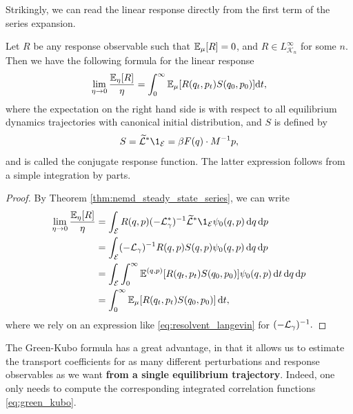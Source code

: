 Strikingly, we can read the linear response directly from the first term of the series expansion.
\begin{corollary}
    Let $R$ be any response observable such that $\mathbb{E}_\mu[R]=0$, and $R\in L^{\infty}_{\mathcal{K}_n}$ for some $n$.
    Then we have the following formula for the linear response
    \begin{equation}
        \label{eq:green_kubo}
        \underset{\eta\to 0}{\lim}\,\frac{\mathbb{E}_{\eta}[R]}{\eta}=\int_0^\infty \mathbb{E}_\mu[R(q_t,p_t)S(q_0,p_0)]\mathrm{d} t,
    \end{equation}
    where the expectation on the right hand side is with respect to all equilibrium dynamics trajectories with canonical initial distribution, and $S$ is defined by
    \begin{equation}
        \label{eq:conjugate_response}
        S=\widetilde{\cL}^*\1_{\mathcal E}=\beta F(q)\cdot M^{-1}p,
    \end{equation}
    and is called the conjugate response function. The latter expression follows from a simple integration by parts.
\end{corollary}
\begin{proof}
    By Theorem \ref{thm:nemd_steady_state_series}, we can write 
    \begin{align*}
        \underset{\eta\to 0}{\lim}\,\frac{\E_{\eta}[R]}{\eta}&=\int_{\mathcal E}R(q,p)(-\cL_\gamma^*)^{-1}\widetilde{\cL}^*\1_{\mathcal E}\psi_0(q,p)\,\dif q\, \dif p\\
        &=\int_{\mathcal E}(-\cL_\gamma)^{-1}R(q,p)S(q,p)\psi_0(q,p)\,\dif q\, \dif p\\
        &=\int_{\mathcal E}\int_0^\infty\E^{(q,p)}[R(q_t,p_t)S(q_0,p_0)]\psi_0(q,p)\,\dif t\,\dif q\,\dif p\\
        &=\int_0^\infty \E_\mu[R(q_t,p_t)S(q_0,p_0)]\,\dif t,
    \end{align*}
    where we rely on an expression like \eqref{eq:resolvent_langevin} for $(-\mathcal{L}_\gamma)^{-1}.$
\end{proof}
The Green-Kubo formula has a great advantage, in that it allows us to estimate the transport coefficients for as many different perturbations and response observables as we want \textbf{from a single equilibrium trajectory}.
Indeed, one only needs to compute the corresponding integrated correlation functions \eqref{eq:green_kubo}.
